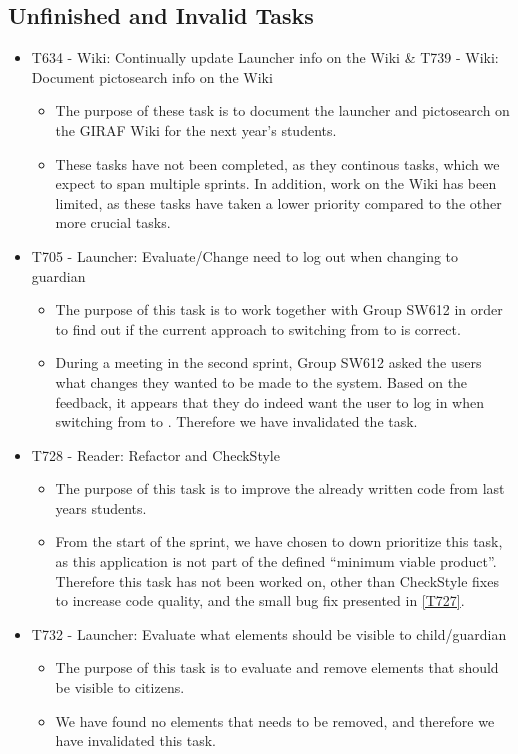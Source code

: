 \subsection{Unfinished and Invalid Tasks}
\begin{itemize}
  \item T634 - Wiki: Continually update Launcher info on the Wiki \& T739 -
  Wiki: Document pictosearch info on the Wiki
  \begin{itemize}
  	\item The purpose of these task is to document the launcher and pictosearch
  	on the GIRAF Wiki for the next year's students. 
  	\item These tasks have not been completed, as they continous tasks, which we
  	expect to span multiple sprints. In addition, work on the Wiki has been
  	limited, as these tasks have taken a lower priority compared to
  	the other more crucial tasks.
  \end{itemize}
  \item T705 - Launcher: Evaluate/Change need to log out when changing  to
  guardian
  \begin{itemize}
  	\item The purpose of this task is to work together with Group SW612 in order
  	to find out if the current approach to switching from  to
  	 is correct. 
  	\item During a meeting in the second sprint, Group SW612 asked the users
  	what changes they wanted to be made to the system. Based on the feedback, it
  	appears that they do indeed want the user to log in when switching from
  	 to . Therefore we have invalidated the task.
  \end{itemize}
  \item T728 - Reader: Refactor and CheckStyle
    \begin{itemize}
  	\item The purpose of this task is to improve the already written code from
  	last years students. 
  	\item From the start of the sprint, we have chosen to down prioritize this
  	task, as this application is not part of the defined ``minimum viable
  	product''. Therefore this task has not been worked on, other than CheckStyle
  	fixes to increase code quality, and the small bug fix presented in
  	\autoref{T727}.
  \end{itemize}
  \item T732 - Launcher: Evaluate what elements should be visible to
child/guardian
  \begin{itemize}
  	\item The purpose of this task is to evaluate and remove elements that should
  	be visible to citizens.
  	\item We have found no elements that needs to be removed, and therefore we
  	have invalidated this task.
  \end{itemize}
\end{itemize}





















